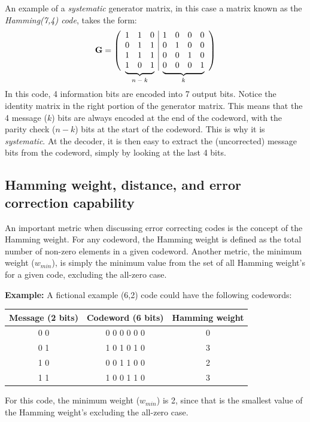 \documentclass[11pt]{article}
\newcommand\undermat[2]{%
  \makebox[0pt][l]{$\smash{\underbrace{\phantom{%
    \begin{matrix}#2\end{matrix}}}_{\text{$#1$}}}$}#2}
\numberwithin{equation}{subsection}
\begin{document}
An example of a \textit{systematic} generator matrix, in this case a matrix known as the \textit{Hamming(7,4) code}, takes the form:
\begin{equation}
\mathbf{G} = 
\left(
\begin{array}{ccc|cccc}
  1 & 1 & 0 & 1 & 0 & 0 & 0 \\
  0 & 1 & 1 & 0 & 1 & 0 & 0 \\
  1 & 1 & 1 & 0 & 0 & 1 & 0 \\
  \undermat{n-k}{1 & 0 & 1} & \undermat{k}{0 & 0 & 0 & 1} \\
  \end{array}
\right)
\end{equation}
\\
In this code, 4 information bits are encoded into 7 output bits.
Notice the identity matrix in the right portion of the generator matrix. This means that the 4 message ($k$) bits are always encoded at the end of the codeword, with the parity check ($n-k$) bits at the start of the codeword. This is why it is \textit{systematic}. At the decoder, it is then easy to extract the (uncorrected) message bits from the codeword, simply by looking at the last 4 bits.

\subsection{Hamming weight, distance, and error correction capability}

An important metric when discussing error correcting codes is the concept of the Hamming weight. 
For any codeword, the Hamming weight is defined as the total number of non-zero elements in a given codeword. 
Another metric, the minimum weight ($w_{min}$), is simply the minimum value from the set of all Hamming weight's for a given code, excluding the all-zero case.

\textbf{Example:}
A fictional example (6,2) code could have the following codewords:

\begin{center}
\begin{tabular}{ c | c | c }
Message (2 bits) & Codeword (6 bits) & Hamming weight \\
\hline
0 0 & 0 0 0 0 0 0 & 0 \\
0 1 & 1 0 1 0 1 0 & 3 \\
1 0 & 0 0 1 1 0 0 & 2 \\
1 1 & 1 0 0 1 1 0 & 3 \\
\end{tabular}
\end{center}
For this code, the minimum weight ($w_{min}$) is 2, since that is the smallest value of the Hamming weight's excluding the all-zero case.
\end{document}
